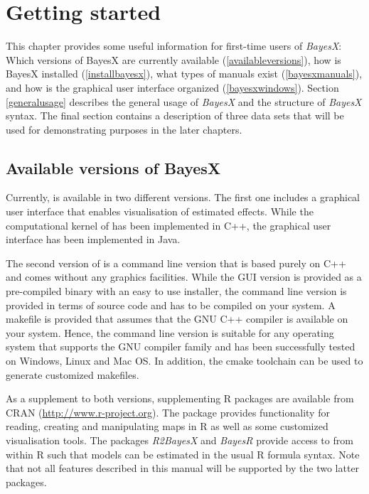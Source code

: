 \chapter{Getting started}
\label{gettingstarted}

This chapter provides some useful information for first-time users
of {\em BayesX}: Which versions of BayesX are currently available
(\autoref{availableversions}), how is BayesX installed
(\autoref{installbayesx}), what types of manuals exist
(\autoref{bayesxmanuals}), and how is the graphical user interface
organized (\autoref{bayesxwindows}). Section \ref{generalusage}
describes the general usage of {\em BayesX} and the structure of
{\em BayesX} syntax. The final section contains a description of
three data sets that will be used for demonstrating purposes in
the later chapters.

\section{Available versions of BayesX}
\label{availableversions}    

Currently, \BayesX is available in two different versions. The first one includes a graphical user interface that enables
visualisation of estimated effects. While the computational kernel of \BayesX has been implemented in C++, the graphical
user interface has been implemented in Java.

The second version of \BayesX is a command line version that is based purely on C++ and comes without any graphics
facilities. While the GUI version is provided as a pre-compiled binary with an easy to use installer, the command line
version is provided in terms of source code and has to be compiled on your system. A makefile is provided that assumes that
the GNU C++ compiler is available on your system. Hence, the command line version is suitable for any operating system that
supports the GNU compiler family and has been successfully tested on Windows, Linux and Mac OS. In addition, the cmake toolchain can be used to generate customized makefiles.

As a supplement to both versions, supplementing R packages are available from CRAN (\href{http://www.r-project.org}{http://www.r-project.org}). The package  \BayesX provides functionality for reading, creating and manipulating maps in R as well as some customized visualisation tools. The packages {\it R2BayesX} and {\it BayesR} provide access to \BayesX from within R such that models can be estimated in the usual R formula syntax. Note that not all features described in this manual will be supported by the two latter packages.

